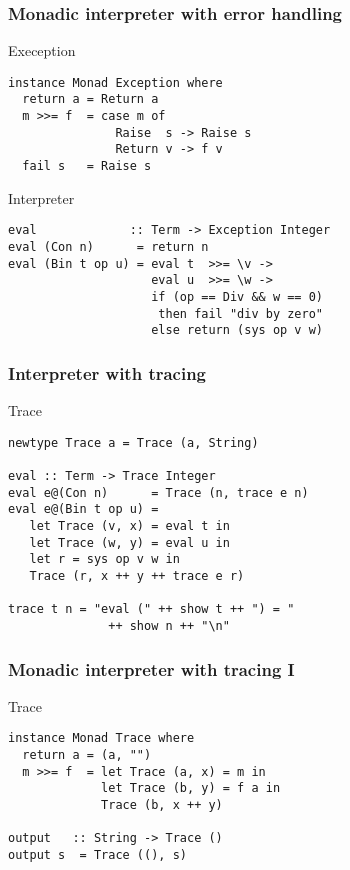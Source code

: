 \documentclass{beamer}
\begin{document}
\begin{frame}[fragile]
  \frametitle{Monadic interpreter with error handling}
  \begin{alertblock}{Exeception}
\begin{verbatim}
instance Monad Exception where
  return a = Return a
  m >>= f  = case m of 
               Raise  s -> Raise s
               Return v -> f v
  fail s   = Raise s
\end{verbatim}  
\end{alertblock}

\begin{exampleblock}{Interpreter}
\begin{verbatim}
eval             :: Term -> Exception Integer
eval (Con n)      = return n
eval (Bin t op u) = eval t  >>= \v ->
                    eval u  >>= \w ->
                    if (op == Div && w == 0) 
                     then fail "div by zero"
                    else return (sys op v w)
\end{verbatim}  
\end{exampleblock}
\end{frame}             

\begin{frame}[fragile]
  \frametitle{Interpreter with tracing}
  \begin{block}{Trace}
\begin{verbatim}
newtype Trace a = Trace (a, String)

eval :: Term -> Trace Integer
eval e@(Con n)      = Trace (n, trace e n)
eval e@(Bin t op u) = 
   let Trace (v, x) = eval t in
   let Trace (w, y) = eval u in
   let r = sys op v w in
   Trace (r, x ++ y ++ trace e r)

trace t n = "eval (" ++ show t ++ ") = "
              ++ show n ++ "\n"
\end{verbatim}  
\end{block}
\end{frame}


\begin{frame}[fragile]
  \frametitle{Monadic interpreter with tracing I}
  \begin{alertblock}{Trace}
\begin{verbatim}
instance Monad Trace where
  return a = (a, "")
  m >>= f  = let Trace (a, x) = m in
             let Trace (b, y) = f a in
             Trace (b, x ++ y)

output   :: String -> Trace ()
output s  = Trace ((), s)
\end{verbatim}  
\end{alertblock}
\end{frame}
\end{document}
